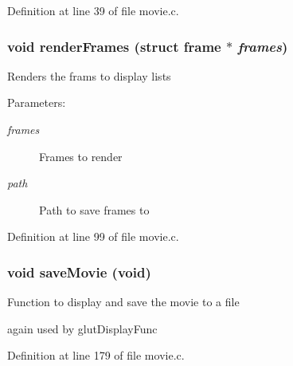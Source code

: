Definition at line 39 of file movie.c.
\subsubsection{\setlength{\rightskip}{0pt plus 5cm}void render\-Frames (struct {\bf frame} $\ast$ {\em frames})}\label{movie_8h_a3}


Renders the frams to display lists

\begin{Desc}
\item[Parameters:]
\begin{description}
\item[{\em frames}]Frames to render \item[{\em path}]Path to save frames to \end{description}
\end{Desc}


Definition at line 99 of file movie.c.
\subsubsection{\setlength{\rightskip}{0pt plus 5cm}void save\-Movie (void)}\label{movie_8h_a5}


Function to display and save the movie to a file

again used by glut\-Display\-Func 

Definition at line 179 of file movie.c.